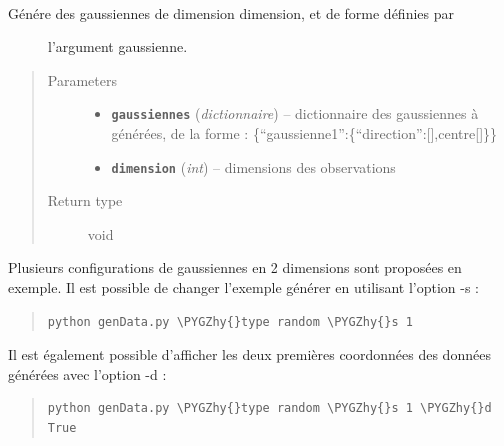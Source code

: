 \documentclass[letterpaper,10pt,english]{sphinxmanual}
\def\PYGZhy{\char`\-}
\begin{document}
\begin{fulllineitems}
\label{nD:genData.gen_random_data}~\begin{description}
\item[{Génére des gaussiennes de dimension dimension, et de forme définies par}] \leavevmode
l'argument gaussienne.

\end{description}
\begin{quote}\begin{description}
\item[{Parameters}] \leavevmode\begin{itemize}
\item {} 
\textbf{\texttt{gaussiennes}} (\emph{dictionnaire}) -- dictionnaire des gaussiennes à générées, de la forme :
\{``gaussienne1'':\{``direction'':{[}{]},centre{[}{]}\}\}

\item {} 
\textbf{\texttt{dimension}} (\emph{int}) -- dimensions des observations

\end{itemize}

\item[{Return type}] \leavevmode
void

\end{description}\end{quote}

\end{fulllineitems}


Plusieurs configurations de gaussiennes en 2 dimensions sont proposées en exemple.
Il est possible de changer l'exemple générer en utilisant l'option -s :
\begin{quote}

\begin{Verbatim}[commandchars=\\\{\}]
python genData.py \PYGZhy{}type random \PYGZhy{}s 1
\end{Verbatim}
\end{quote}

Il est également possible d'afficher les deux premières coordonnées des données générées avec l'option -d :
\begin{quote}

\begin{Verbatim}[commandchars=\\\{\}]
python genData.py \PYGZhy{}type random \PYGZhy{}s 1 \PYGZhy{}d True
\end{Verbatim}
\end{quote}
\end{document}
